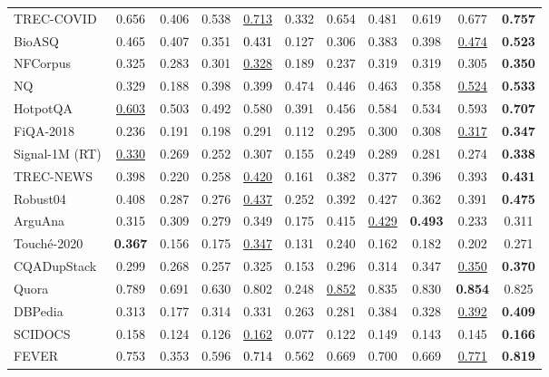 \documentclass{article}
\begin{document}
\begin{table*}[t!]
{\begin{tabular}{l | c | c c c | c c c c | c | c}
   TREC-COVID    & 0.656 & 0.406 & 0.538 & \underline{0.713} & 0.332& 0.654 & 0.481 & 0.619 & 0.677 & \textbf{0.757}\\
   BioASQ        & 0.465 & 0.407 & 0.351 & \textcolor{black}{0.431} & 0.127 & 0.306 & 0.383 & 0.398 & \underline{0.474} & \textbf{0.523} \\
   NFCorpus      & 0.325 & 0.283 & 0.301 & \underline{0.328} & 0.189 & 0.237 & 0.319 & 0.319 & 0.305 & \textbf{0.350} \\ \midrule
   NQ            & 0.329 & 0.188 & 0.398 & 0.399 & 0.474 & 0.446 & 0.463 & 0.358 & \underline{0.524} & \textbf{0.533} \\ 
   HotpotQA      & \underline{0.603} & 0.503 & 0.492 & 0.580 & 0.391 & 0.456 & 0.584 & 0.534 & 0.593 & \textbf{0.707} \\ 
   FiQA-2018     & 0.236 & 0.191 & 0.198 & 0.291 & 0.112 & 0.295 & 0.300 & 0.308 & \underline{0.317} & \textbf{0.347} \\ \midrule
   Signal-1M (RT)& \underline{0.330} & 0.269 & 0.252 & 0.307 & 0.155 & 0.249 & 0.289 & 0.281 & 0.274 & \textbf{0.338} \\ \midrule
   TREC-NEWS     & 0.398 & 0.220 & 0.258 & \underline{0.420} & 0.161 & 0.382 & 0.377 & 0.396 & 0.393 & \textbf{0.431} \\
   Robust04     & 0.408 & 0.287 & 0.276 & \underline{0.437} & 0.252 & 0.392 & 0.427 & 0.362 & 0.391 & \textbf{0.475} \\ \midrule
   ArguAna       & 0.315 & 0.309 & 0.279 & 0.349 & 0.175& 0.415 & \underline{0.429} & \textbf{0.493} & 0.233 & 0.311 \\  
   Touch\'e-2020 & \textbf{0.367} & 0.156 & 0.175 & \underline{0.347} & 0.131 & 0.240 & 0.162 & 0.182 & 0.202 & 0.271 \\ \midrule 
   CQADupStack   & 0.299 & 0.268 & 0.257 & 0.325 & 0.153 & 0.296 & 0.314 & 0.347 & \underline{0.350} & \textbf{0.370} \\
   Quora         & 0.789 & 0.691 & 0.630 & 0.802 & 0.248 & \underline{0.852} & 0.835 & 0.830 & \textbf{0.854} & 0.825 \\ \midrule
   DBPedia       & 0.313  & 0.177 & 0.314 & 0.331 & 0.263 & 0.281 & 0.384 & 0.328 & \underline{0.392} & \textbf{0.409} \\ \midrule
   SCIDOCS       & 0.158 & 0.124 & 0.126 & \underline{0.162} & 0.077 & 0.122 & 0.149 & 0.143 & 0.145 & \textbf{0.166} \\ \midrule
   FEVER         & 0.753 & 0.353 & 0.596 & \textcolor{black}{0.714} & 0.562& 0.669 & 0.700 & 0.669 & \underline{0.771} & \textbf{0.819} \\ 

\end{tabular}}
\end{table*}
\end{document}
